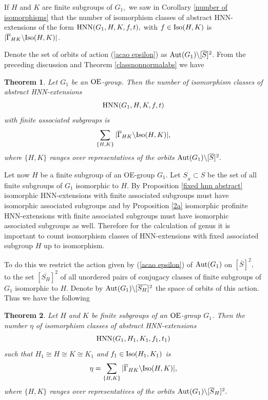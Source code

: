 \documentclass[a4paper,12pt]{article}
\newtheorem{thm}{Theorem}[section]
\def\OE{{\rm OE}}
\def\aut {{\rm Aut}}
\def\hnn {{\rm HNN}}
\def\Iso {{\rm Iso}}
\begin{document}
{%

If $H$ and $K$ are finite subgroups of  $G_1,$ we saw in Corollary \ref{number of isomorphisms} that the number of isomorphism classes of abstract HNN-extensions of the form $\hnn(G_1, H, K, f, t),$ with $f \in \Iso(H, K)$ is 
$|\overline{\Gamma}_{HK} \backslash \Iso(H, K)|$. 

\medskip
Denote the set of orbits of action (\ref{acao epsilon}) as $\aut(G_1)\backslash [\overline{S}]^2$. From the preceding discussion and Theorem \ref{classnonnormalabs} we have  

\begin{thm} \label{general finite associated} Let $G_1$ be  an $\OE$-group. Then the number  of isomorphism classes of abstract HNN-extensions $$\hnn(G_1, H,K, f,t)$$ with finite associated subgroups  is $$\sum_{\{H, K\}} |\overline{\Gamma}_{HK} \backslash \Iso(H, K)|,$$ where $\{H, K\}$ ranges over representatives of the orbits $\aut(G_1)\backslash [\overline{S}]^2.$ \end{thm}



Let now $H$ be a finite subgroup of an OE-group $G_1.$ Let $S_{_{H}} \subset S$ be the set of all finite subgroups of $G_1$ isomorphic to $H$.
By Proposition \ref{fixed hnn abstract}   isomorphic HNN-extensions with finite associated subgroups must have isomorphic associated subgroups and by Proposition \ref{2a} isomorphic profinite HNN-extensions with finite associated subgroups must have isomorphic associated subgroups as well. 
Therefore for the calculation of genus it is important to count isomorphism classes of HNN-extensions with fixed associated subgroup $H$ up to isomorphism.

To do this we restrict  the action given by (\ref{acao epsilon}) of $\aut(G_1)$ on $[\overline{S}]^2,$ to the set $[\overline{S_H}]^2$ of all unordered pairs of conjugacy classes of finite  subgroups of $G_1$ isomorphic to $H$. Denote by $\aut(G_1) \backslash [\overline{S_H}]^2$ the space of orbits of this action. Thus we have the following

\begin{thm} \label{classe geral familia F} Let $H$ and $K$ be finite subgroups of an $\OE$-group $G_1$. Then the number $\eta$ of isomorphism classes of abstract HNN-extensions $$\hnn(G_1, H_1,\\
K_1, f_1,t_1)$$ such that %
$H_1 \cong H \cong K \cong  K_1$ and $f_1 \in \Iso(H_1, K_1)$ is $$\eta  = \sum_{\{H, K\}} |\overline{\Gamma}_{HK} \backslash \Iso(H, K)|,$$ where $\{H, K\}$ ranges over representatives of the orbits $\aut(G_1)\backslash [\overline{S}_H]^2.$
\end{thm} 

}
\end{document}
